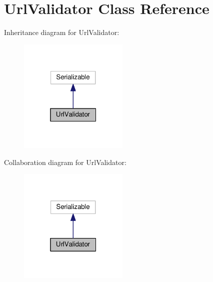 \hypertarget{classUrlValidator}{}\section{Url\+Validator Class Reference}
\label{classUrlValidator}


Inheritance diagram for Url\+Validator\+:\nopagebreak
\begin{figure}[H]
\begin{center}
\leavevmode
\includegraphics[width=148pt]{classUrlValidator__inherit__graph}
\end{center}
\end{figure}


Collaboration diagram for Url\+Validator\+:\nopagebreak
\begin{figure}[H]
\begin{center}
\leavevmode
\includegraphics[width=148pt]{classUrlValidator__coll__graph}
\end{center}
\end{figure}
